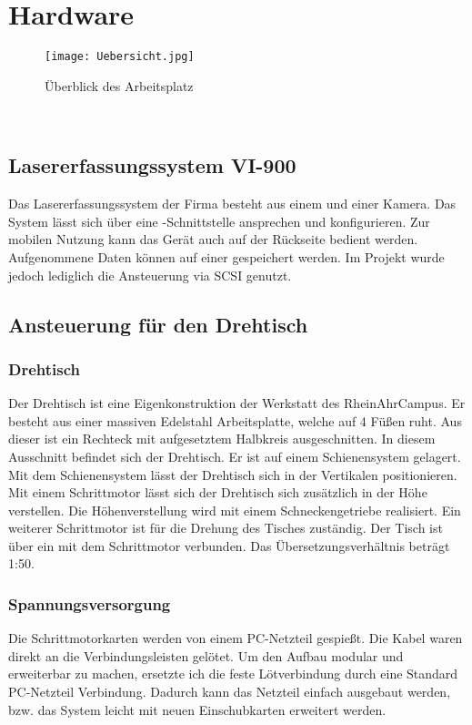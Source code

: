 \chapter{Hardware}
\label{sec:Hardware}
\begin{figure}[htb]
\centering
\texttt{[image: Uebersicht.jpg]}
\caption{Überblick des Arbeitsplatz}
\label{fig:Übersicht}
\end{figure}

\\

\section{Lasererfassungssystem VI-900}
Das Lasererfassungssystem  der Firma  besteht aus einem  und einer Kamera. Das System lässt sich über eine -Schnittstelle ansprechen und konfigurieren. Zur mobilen Nutzung kann das Gerät auch auf der Rückseite bedient werden. Aufgenommene Daten können auf einer  gespeichert werden. Im Projekt wurde jedoch lediglich die Ansteuerung via SCSI genutzt.

\section{Ansteuerung für den Drehtisch}
\subsection{Drehtisch}
Der Drehtisch ist eine Eigenkonstruktion der Werkstatt des RheinAhrCampus. Er besteht aus einer massiven Edelstahl Arbeitsplatte, welche auf 4 Füßen ruht. Aus dieser ist ein Rechteck mit aufgesetztem Halbkreis ausgeschnitten. In diesem Ausschnitt befindet sich der Drehtisch. Er ist auf einem Schienensystem gelagert. Mit dem Schienensystem lässt der Drehtisch sich in der Vertikalen positionieren. Mit einem Schrittmotor lässt sich der Drehtisch sich zusätzlich in der Höhe verstellen. Die Höhenverstellung wird mit einem Schneckengetriebe realisiert. Ein weiterer Schrittmotor ist für die Drehung des Tisches zuständig. Der Tisch ist über ein  mit dem Schrittmotor verbunden. Das Übersetzungsverhältnis beträgt 1:50.   
\subsection{Spannungsversorgung}
Die Schrittmotorkarten werden von einem PC-Netzteil gespießt. Die Kabel waren direkt an die Verbindungsleisten gelötet. Um den Aufbau modular und erweiterbar zu machen, ersetzte ich die feste Lötverbindung durch eine Standard PC-Netzteil Verbindung. Dadurch kann das Netzteil einfach ausgebaut werden, bzw. das System leicht mit neuen Einschubkarten erweitert werden.

